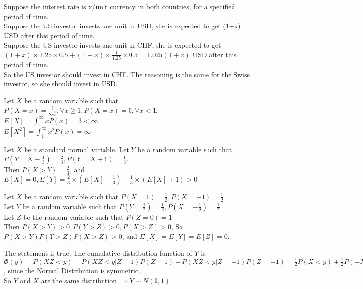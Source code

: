 \documentclass[12pt]{article}
\newenvironment{problem}[2][Problem]{\begin{trivlist}
\item[\hskip \labelsep {\bfseries #1}\hskip \labelsep {\bfseries #2.}]}{\end{trivlist}}
\begin{document}
\begin{problem}{5}\hfill\linebreak
Suppose the interest rate is x/unit currency in both countries, for a specified period of time.\\
Suppose the US investor invests one unit in USD, she is expected to get (1+x) USD after this period of time.\\
Suppose the US investor invests one unit in CHF, she is expected to get $(1+x)\times 1.25\times 0.5+(1+x)\times \frac{1}{1.25}\times 0.5=1.025(1+x)$ USD after this period of time.\\
So the US investor should invest in CHF. The reasoning is the same for the Swiss investor, so she should invest in USD.
\end{problem}

\begin{problem}{6(a)}\hfill\linebreak
Let $X$ be a random variable such that $P(X=x)=\frac{3}{2x^{\frac{5}{2}}}, \forall x\geq 1, P(X=x)=0, \forall x<1$.
$E[X]=\int_1^\infty xP(x)=3<\infty$\\
$E[X^2]=\int_1^\infty x^2P(x)=\infty$
\end{problem}

\begin{problem}{6(b)}\hfill\linebreak
Let $X$ be a standard normal variable. Let $Y$ be a random variable such that $P(Y=X-\frac{1}{3})=\frac{2}{3}, P(Y=X+1)=\frac{1}{3}$.\\
Then $P(X>Y)=\frac{2}{3}$, and $E[X]=0, E[Y]=\frac{2}{3}\times (E[X]-\frac{1}{3})+\frac{1}{3}\times (E[X]+1)>0$
\end{problem}

\begin{problem}{6(c)}\hfill\linebreak
Let $X$ be a random variable such that $P(X=1)=\frac{1}{2}, P(X=-1)=\frac{1}{2}$\\
Let $Y$ be a random variable such that $P(Y=\frac{1}{2})=\frac{1}{2}, P(X=-\frac{1}{2})=\frac{1}{2}$\\
Let $Z$ be the random variable such that $P(Z=0)=1$\\
Then $P(X>Y)>0, P(Y>Z)>0, P(X>Z)>0$, So $P(X>Y)P(Y>Z)P(X>Z)>0$, and $E[X]=E[Y]=E[Z]=0$.
\end{problem}

\begin{problem}{7(a)}\hfill\linebreak
The statement is true.
The cumulative distribution function of $Y$ is\\ $\Phi(y)=P(XZ<y)=P(XZ<y|Z=1)P(Z=1)+P(XZ<y|Z=-1)P(Z=-1)=\frac{1}{2}P(X<y)+\frac{1}{2}P(-X<y)=\frac{1}{2}P(X<y)+\frac{1}{2}P(X>-y)=P(X<y)=\Phi(x)$, since the Normal Distribution is symmetric.\\
So $Y$ and $X$ are the same distribution $\Rightarrow Y\sim N(0,1)$
\end{problem}
\end{document}
